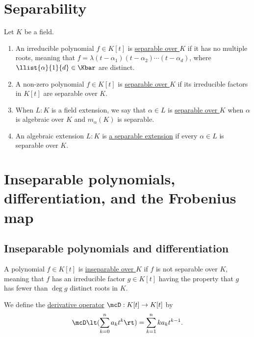 \documentclass{article}
\begin{document}
\section{Separability}
  \begin{tdefinition}[Separable]
    Let \( K \) be a field. \begin{enumerate}[label=(\roman*)]
      \item An irreducible polynomial \( f\in K[t] \) is \ul{separable over \( K \)} if it has no multiple roots, meaning that \( f=\lambda(t-\alpha_1)(t-\alpha_2)\cdots(t-\alpha_d) \), where \( \llist{\alpha}{1}{d}\in \Kbar \) are distinct.
      \item A non-zero polynomial \( f\in K[t] \) is \ul{separable over \( K \)} if its irreducible factors in \( K[t] \) are separable over \( K \).
      \item When \( L:K \) is a field extension, we say that \( \alpha \in L \) is \ul{separable over \( K \)} when \( \alpha \) is algebraic over \( K \) and \( m_\alpha(K) \) is separable.
      \item An algebraic extension \( L:K \) is \ul{a separable extension} if every \( \alpha\in L \) is separable over \( K \).
    \end{enumerate}
  \end{tdefinition}

\section{Inseparable polynomials, differentiation, and the Frobenius map}
\subsection{Inseparable polynomials and differentiation}
  \begin{tdefinition}[Inseparable]
    A polynomial \( f \in K[t] \) is \ul{inseparable over \( K \)} if \( f \) is not separable over \( K \), meaning that \( f \) has an irreducible factor \( g \in K[t] \) having the property that \( g \) has fewer than \( \deg g \) distinct roots in \( K \).
  \end{tdefinition}

  \begin{tdefinition}
    We define the \ul{derivative operator} \( \mcD:K[t]\to K[t] \) by \begin{align*}
      \mcD\lt(\sum_{k=0}^{n}a_kt^k\rt) = \sum_{k=1}^{n}ka_kt^{k-1}.
    \end{align*}
  \end{tdefinition}
\end{document}
